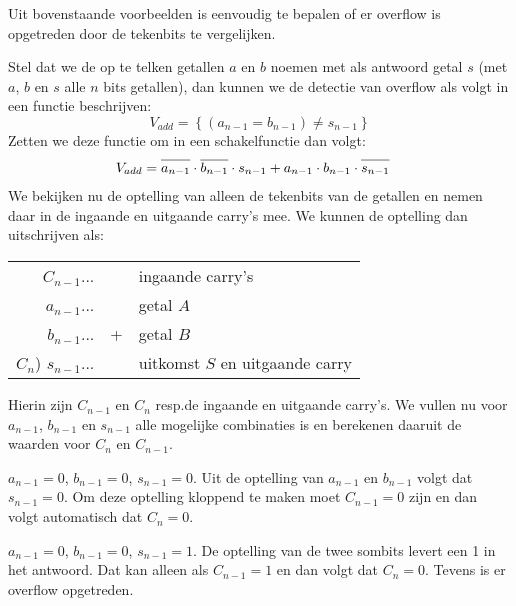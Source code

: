 \documentclass[a4paper,12pt,oneside]{article}
\newcommand*{\oline}[1]{\overline{#1\mathstrut}}
\theoremstyle{own}
\begin{document}
Uit bovenstaande voorbeelden is eenvoudig te bepalen of er overflow is
opgetreden door de tekenbits te vergelijken.

Stel dat we de op te telken getallen $a$ en $b$ noemen met als antwoord getal
$s$ (met $a$, $b$ en $s$ alle $n$ bits getallen), dan kunnen we de detectie
van overflow als volgt in een functie beschrijven:
%
\begin{equation}
\label{eqn:overflowaddhighlevel}
V_{add} = \left\lbrace (a_{n-1} = b_{n-1}) \neq s_{n-1} \right\rbrace
\end{equation}
%
Zetten we deze functie om in een schakelfunctie dan volgt:
%
\begin{equation}
\begin{split}
\label{eqn:funcoverflowadd}
V_{add} &= \oline{a_{n-1}}\cdot\oline{b_{n-1}}\cdot s_{n-1} + a_{n-1}\cdot b_{n-1}\cdot\oline{s_{n-1}}
\end{split}
\end{equation}
%
We bekijken nu de optelling van alleen de tekenbits van de getallen en nemen
daar in de ingaande en uitgaande carry's mee. We kunnen de optelling dan
uitschrijven als:

\begin{table}[H]
  \centering
  \begin{tabular}{ r c l}
           $C_{n-1}$... &   & ingaande carry's \\
           $a_{n-1}$... &   & getal $A$    \\
           $b_{n-1}$... & + & getal $B$   \\  \cmidrule{1-1}
    $C_n$) $s_{n-1}$... &   & uitkomst $S$ en uitgaande carry  \\
  \end{tabular}
\end{table}
\unskip%

Hierin zijn $C_{n-1}$ en $C_n$ resp.\@ de ingaande en uitgaande carry's.
We vullen nu voor $a_{n-1}$, $b_{n-1}$ en $s_{n-1}$ alle mogelijke combinaties
is en berekenen daaruit de waarden voor $C_n$ en $C_{n-1}$.

$a_{n-1}=0$, $b_{n-1}=0$, $s_{n-1}=0$. Uit de optelling van $a_{n-1}$ en
$b_{n-1}$ volgt dat $s_{n-1}=0$. Om deze optelling kloppend te maken moet
$C_{n-1} = 0$ zijn en dan volgt automatisch dat $C_n = 0$.

$a_{n-1}=0$, $b_{n-1}=0$, $s_{n-1}=1$. De optelling van de twee sombits levert
een 1 in het antwoord. Dat kan alleen als $C_{n-1} = 1$ en dan volgt dat
$C_n = 0$. Tevens is er overflow opgetreden.
\end{document}
